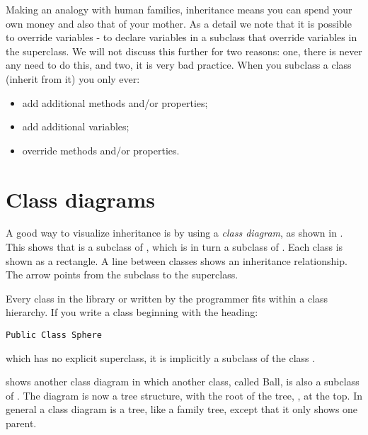 		Making an analogy with human families, inheritance means you can spend your own money and also that of your mother.
As a detail we note that it is possible to override variables - to declare variables in a subclass that override variables in the superclass. We will not discuss this further for two reasons: one, there is never any need to do this, and two, it is very bad practice. When you subclass a class (inherit from it) you only ever:
		\begin{itemize}
      \item add additional methods and/or properties;
      \item add additional variables;
      \item override methods and/or properties.
		\end{itemize}


	\section{Class diagrams}
		A good way to visualize inheritance is by using a \emph{class diagram}, as shown in . This shows that  is a subclass of , which is in turn a subclass of . Each class is shown as a rectangle. A line between classes shows an inheritance relationship. The arrow points from the subclass to the superclass.
		
		Every class in the library or written by the programmer fits within a class hierarchy. If you write a class beginning with the heading:
		\begin{lstlisting}
Public Class Sphere
		\end{lstlisting}
		which has no explicit superclass, it is implicitly a subclass of the class .

		 shows another class diagram in which another class, called Ball, is also a subclass of . The diagram is now a tree structure, with the root of the tree, , at the top. In general a class diagram is a tree, like a family tree, except that it only shows one parent.


